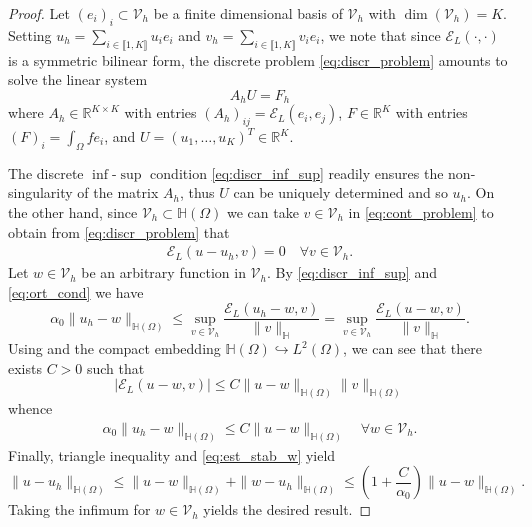 \documentclass[11 pt]{article}
\newcommand\inter[1]{\llbracket #1\rrbracket}
\numberwithin{equation}{section}
\def\R{\mathbb{R}}
\def\cE{\mathcal{E}}
\begin{document}
\begin{proof}
Let $(e_i)_i\subset \mathcal V_h$ be a finite dimensional basis of $\mathcal V_h$ with $\dim(\mathcal V_h)=K$. Setting $u_h=\sum_{i\in\inter{1,K}}u_i e_i$ and $v_h=\sum_{i\in\inter{1,K}} v_i e_i$, we note that since $\cE_{L}(\cdot,\cdot)$ is a symmetric bilinear form, the discrete problem \eqref{eq:discr_problem} amounts to solve the linear system 
%
\begin{equation}
    A_h U = F_h
\end{equation}
%
where $A_h\in\mathbb R^{K\times K}$ with entries $(A_h)_{ij}=\cE_L(e_i,e_j)$, $F\in\R^{K}$ with entries $(F)_i=\int_{\Omega}f e_i$, and $U=(u_1,\ldots, u_K)^T\in \R^{K}$. 

The discrete $\inf$-$\sup$ condition \eqref{eq:discr_inf_sup} readily ensures the non-singularity of the matrix $A_h$, thus $U$ can be uniquely determined and so $u_h$. On the other hand, since $\mathcal V_h\subset \mathbb H(\Omega)$ we can take $v\in \mathcal V_h$ in \eqref{eq:cont_problem} to obtain from \eqref{eq:discr_problem} that
%
\begin{align}\label{eq:ort_cond}
    \cE_{L}(u-u_h,v)=0 \quad\forall v\in\mathcal V_h.
\end{align}
%
Let $w\in\mathcal V_h$ be an arbitrary function in $\mathcal V_h$. By \eqref{eq:discr_inf_sup} and \eqref{eq:ort_cond} we have
%
\begin{equation}
    \alpha_0\|u_h-w\|_{\mathbb H(\Omega)} \leq \sup_{v\in\mathcal V_h}\frac{\cE_{L}(u_h-w,v)}{\|v\|_{\mathbb H}}=\sup_{v\in\mathcal V_h}\frac{\cE_{L}(u-w,v)}{\|v\|_{\mathbb H}}.
\end{equation}
%
Using \cite[Lemma 3.4]{HSS22} and the compact embedding $\mathbb H(\Omega)\hookrightarrow L^2(\Omega)$, we can see that there exists $C>0$ such that
%
\begin{equation*}
    |\cE_{L}(u-w,v)|\leq C\|u-w\|_{\mathbb H(\Omega)}\|v\|_{\mathbb H(\Omega)}
\end{equation*}
%
whence
%
\begin{align}\label{eq:est_stab_w}
    \alpha_0\|u_h-w\|_{\mathbb H(\Omega)} \leq C\|u-w\|_{\mathbb H(\Omega)} \quad\forall w\in\mathcal V_h.
\end{align}
Finally, triangle inequality and \eqref{eq:est_stab_w} yield
%
\begin{equation}
    \|u-u_h\|_{\mathbb H(\Omega)}\leq \|u-w\|_{\mathbb H(\Omega)}+\|w-u_h\|_{\mathbb H(\Omega)}\leq \left(1+\frac{C}{\alpha_0}\right)\|u-w\|_{\mathbb H(\Omega)}.
\end{equation}
%
Taking the infimum for $w\in \mathcal V_h$ yields the desired result. 
\end{proof}
\end{document}
